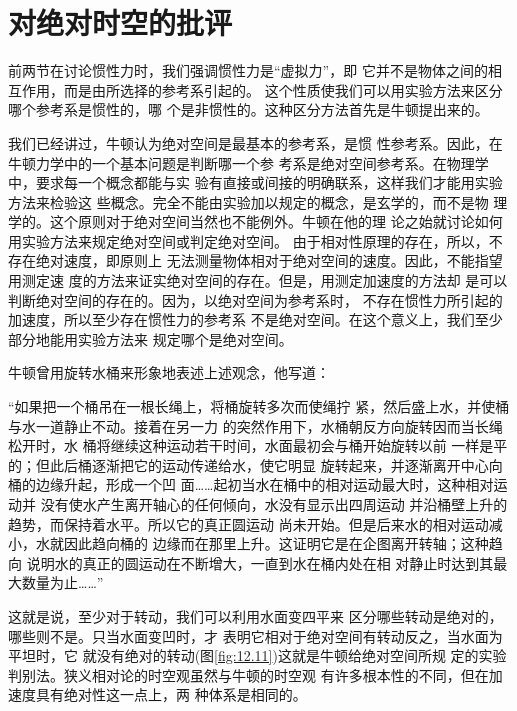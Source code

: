 \section{对绝对时空的批评}

前两节在讨论惯性力时，我们强调惯性力是“虚拟力”，即
它并不是物体之间的相互作用，而是由所选择的参考系引起的。
这个性质使我们可以用实验方法来区分哪个参考系是惯性的，哪
个是非惯性的。这种区分方法首先是牛顿提出来的。

我们已经讲过，牛顿认为绝对空间是最基本的参考系，是惯
性参考系。因此，在牛顿力学中的一个基本问题是判断哪一个参
考系是绝对空间参考系。在物理学中，要求每一个概念都能与实
验有直接或间接的明确联系，这样我们才能用实验方法来检验这
些概念。完全不能由实验加以规定的概念，是玄学的，而不是物
理学的。这个原则对于绝对空间当然也不能例外。牛顿在他的理
论之始就讨论如何用实验方法来规定绝对空间或判定绝对空间。
由于相对性原理的存在，所以，不存在绝对速度，即原则上
无法测量物体相对于绝对空间的速度。因此，不能指望用测定速
度的方法来证实绝对空间的存在。但是，用测定加速度的方法却
是可以判断绝对空间的存在的。因为，以绝对空间为参考系时，
不存在惯性力所引起的加速度，所以至少存在惯性力的参考系
不是绝对空间。在这个意义上，我们至少部分地能用实验方法来
规定哪个是绝对空间。

牛顿曾用旋转水桶来形象地表述上述观念，他写道：

\begin{quoting}
    “如果把一个桶吊在一根长绳上，将桶旋转多次而使绳拧
紧，然后盛上水，并使桶与水一道静止不动。接着在另一力
的突然作用下，水桶朝反方向旋转因而当长绳松开时，水
桶将继续这种运动若干时间，水面最初会与桶开始旋转以前
一样是平的；但此后桶逐渐把它的运动传递给水，使它明显
旋转起来，并逐渐离开中心向桶的边缘升起，形成一个凹
面……起初当水在桶中的相对运动最大时，这种相对运动并
没有使水产生离开轴心的任何倾向，水没有显示出四周运动
并沿桶壁上升的趋势，而保持着水平。所以它的真正圆运动
尚未开始。但是后来水的相对运动减小，水就因此趋向桶的
边缘而在那里上升。这证明它是在企图离开转轴；这种趋向
说明水的真正的圆运动在不断增大，一直到水在桶内处在相
对静止时达到其最大数量为止……”
\end{quoting}

这就是说，至少对于转动，我们可以利用水面变四平来
区分哪些转动是绝对的，哪些则不是。只当水面变凹时，才
表明它相对于绝对空间有转动反之，当水面为平坦时，它
就没有绝对的转动(图\ref{fig:12.11})这就是牛顿给绝对空间所规
定的实验判别法。狭义相对论的时空观虽然与牛顿的时空观
有许多根本性的不同，但在加速度具有绝对性这一点上，两
种体系是相同的。


